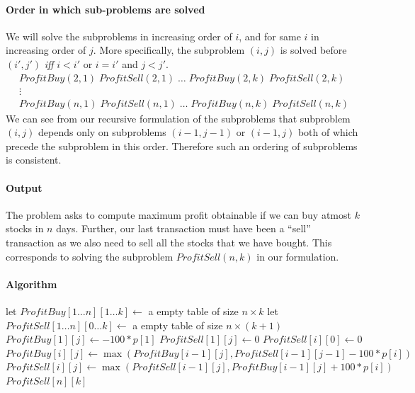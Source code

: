 \documentclass[answers]{exam}
\begin{document}
\begin{questions}
\begin{solution}
\paragraph{Order in which sub-problems are solved}
We will solve the subproblems in increasing order of $i$, and for same $i$ in increasing order of $j$. More specifically, the subproblem $(i, j)$ is solved before $(i', j')$ \emph{iff} $i < i'$ or $i = i'$ and $j < j'$.
\begin{gather*}
    ProfitBuy(2, 1) \; ProfitSell(2, 1) \; \ldots \; ProfitBuy(2, k) \; ProfitSell(2, k) \\
    \vdots\\
    ProfitBuy(n, 1) \; ProfitSell(n, 1) \; \ldots \; ProfitBuy(n, k) \; ProfitSell(n, k)
\end{gather*}
We can see from our recursive formulation of the subproblems that subproblem $(i, j)$ depends only on subproblems $(i-1, j-1)$ or $(i-1, j)$ both of which precede the subproblem in this order. Therefore such an ordering of subproblems is consistent.
\paragraph{Output}
The problem asks to compute maximum profit obtainable if we can buy atmost $k$ stocks in $n$ days. Further, our last transaction must have been a ``sell'' transaction as we also need to sell all the stocks that we have bought. This corresponds to solving the subproblem $ProfitSell(n, k)$ in our formulation.
\paragraph{Algorithm}
\begin{algorithmic}[1]
    \State let $ProfitBuy[1 \ldots n][1 \ldots k] \gets$ a empty table of size $n \times k$
    \State let $ProfitSell[1 \ldots n][0 \ldots k] \gets$ a empty table of size $n \times (k+1)$
        \State $ProfitBuy[1][j] \gets -100 * p[1]$
        \State $ProfitSell[1][j] \gets 0$
    \EndFor
        \State $ProfitSell[i][0] \gets 0$
    \EndFor
            \State $ProfitBuy[i][j] \gets \max(ProfitBuy[i-1][j], ProfitSell[i-1][j-1] - 100 * p[i])$
            \State $ProfitSell[i][j] \gets \max(ProfitSell[i-1][j], ProfitBuy[i-1][j] + 100 * p[i])$
        \EndFor
    \EndFor
    \State \Return $ProfitSell[n][k]$
\EndFunction
\end{algorithmic}

\end{solution}
\end{questions}
\end{document}
